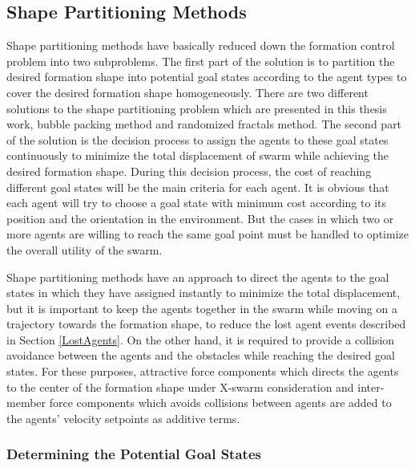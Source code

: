 \subsection{Shape Partitioning Methods} \label{shapepartition_ref}
Shape partitioning methods have basically reduced down the formation control problem into two subproblems. The first part of the solution is to partition the desired formation shape into potential goal states according to the agent types to cover the desired formation shape homogeneously. There are two different solutions to the shape partitioning problem which are presented in this thesis work, bubble packing method and randomized fractals method. The second part of the solution is the decision process to assign the agents to these goal states continuously to minimize the total displacement of swarm while achieving the desired formation shape. During this decision process, the cost of reaching different goal states will be the main criteria for each agent. It is obvious that each agent will try to choose a goal state with minimum cost according to its position and the orientation in the environment. But the cases in which two or more agents are willing to reach the same goal point must be handled to optimize the overall utility of the swarm. 

Shape partitioning methods have an approach to direct the agents to the goal states in which they have assigned instantly to minimize the total displacement, but it is important to keep the agents together in the swarm while moving on a trajectory towards the formation shape, to reduce the lost agent events described in Section \ref{LostAgents}. On the other hand, it is required to provide a collision avoidance between the agents and the obstacles while reaching the desired goal states. For these purposes, attractive force components which directs the agents to the center of the formation shape under X-swarm consideration and inter-member force components which avoids collisions between agents are added to the agents' velocity setpoints as additive terms. 
			
\subsubsection{Determining the Potential Goal States} \label{Partitioning_ref}
